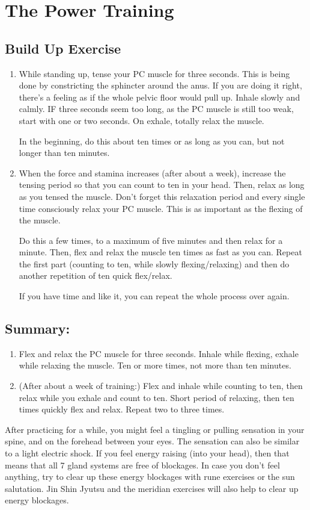 \documentclass[../Book.Stress_regulation.tex]{subfiles}
\begin{document}
\section{The Power Training}

\subsection*{Build Up Exercise}

\begin{enumerate}
	\item While standing up, tense your PC muscle for three seconds. 
	This is being done by constricting the sphincter around the anus.
	If you are doing it right, there's a feeling as if the whole pelvic floor would pull up.
	Inhale slowly and calmly.
	IF three seconds seem too long, as the PC muscle is still too weak, start with one or two seconds.
	On exhale, totally relax the muscle.
	
	In the beginning, do this about ten times or as long as you can, but not longer than ten minutes.
	
	\item When the force and stamina increases (after about a week), 
	increase the tensing period so that you can count to ten in your head.
	Then, relax as long as you tensed the muscle. 
	Don't forget this relaxation period and every single time consciously relax your PC muscle.
	This is as important as the flexing of the muscle.
	
	Do this a few times, to a maximum of five minutes and then
	relax for a minute.
	Then, flex and relax the muscle ten times as fast as you can.
	Repeat the first part (counting to ten, while slowly flexing/relaxing) 
	and then do another repetition of ten quick flex/relax.
	
	If you have time and like it, you can repeat the whole process over again.
\end{enumerate}

\subsection*{Summary:}

\begin{enumerate}
	\item Flex and relax the PC muscle for three seconds. 
	Inhale while flexing, exhale while relaxing the muscle. 
	Ten or more times, not more than ten minutes.
	\item (After about a week of training:) 
	Flex and inhale while counting to ten, then relax while you  exhale and count to ten.
	Short period of relaxing, then ten times quickly flex and relax.
	Repeat two to three times.
\end{enumerate}

After practicing for a while, you might feel a tingling or pulling sensation in your spine,
and on the forehead between your eyes. 
The sensation can also be similar to a light electric shock.
If you feel energy raising (into your head), then that means that all 7  gland systems are free of blockages.
In case you don't feel anything, try to clear up these energy blockages with rune exercises or the sun salutation.
Jin Shin Jyutsu and the meridian  exercises will also help to clear up energy blockages.
\end{document}
